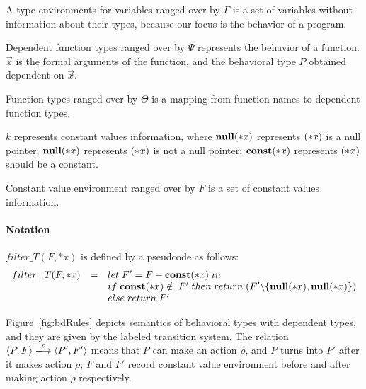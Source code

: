 A type environments for variables ranged over by \(\Gamma\) is a set
of variables without information about their types, because our
focus is the behavior of a program.

Dependent function types ranged over by \(\Psi\) represents the
behavior of a function. \(\vec{x}\) is the formal arguments of the
function, and the behavioral type \(P\) obtained dependent on
\(\vec{x}\).

Function types ranged over by \(\Theta\) is a mapping from function names to dependent function types.

\(k\) represents constant values information, where \(\mathbf{null}(*x)\) represents
\((*x)\) is a null pointer; \(\mathbf{null}(*x)\) represents \((*x)\) is not a
null pointer; \(\mathbf{const}(*x)\) represents \((*x)\) should be a constant.

Constant value environment ranged over by \(F\) is a set of constant
values information.

\paragraph{Notation}
\(filter\_T(F, *x)\) is defined by a pseudcode as follows:
\[
\begin{array}{lcl}
  filter\_T(F, *x) &=& let \; F' = F - \mathbf{const}(*x) \; in \\
  & & if \; \mathbf{const}(*x) \notin \; F'\; then \; return \; (F' \backslash \{\mathbf{null}(*x),\mathbf{null}(*x)\})\\
  & & else \; return \; F'
\end{array}
\]


Figure~\ref{fig:bdRules} depicts semantics of behavioral types with
dependent types, and they are given by the labeled transition
system. The relation \( \langle P, F \rangle \xlongrightarrow{\rho}
\langle P', F' \rangle \) means that \(P\) can make an action
\(\rho\), and \(P\) turns into \(P'\) after it makes action \(\rho\);
\(F\) and \(F'\) record constant value environment before and after
making action \(\rho\) respectively.


